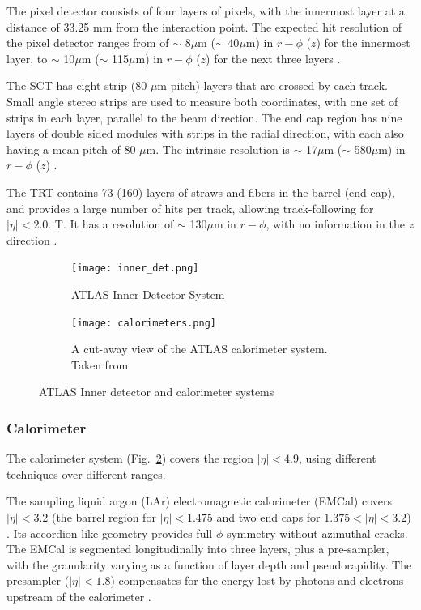 The pixel detector consists of four layers of pixels, with the innermost layer at a distance of 33.25 mm from the interaction point. The expected hit resolution of the pixel detector ranges from of $\sim$ 8$\mu$m ($\sim$ 40$\mu$m) in $r-\phi$ ($z$) \cite{ibl_design} for the innermost layer, to $\sim$ 10$\mu$m ($\sim$ 115$\mu$m) in $r-\phi$ ($z$) for the next three layers \cite{Aad:2008zzm}.

The SCT has eight strip (80 $\mu$m pitch) layers that are crossed by each track. Small angle stereo strips are used to measure both coordinates, with one set of strips in each layer, parallel to the beam direction. The end cap region has nine layers of double sided modules with strips in the radial direction, with each also having a mean pitch of 80 $\mu$m. The intrinsic resolution is $\sim$ 17$\mu$m ($\sim$ 580$\mu$m) in $r-\phi$ ($z$)  \cite{Aad:2008zzm}.

The TRT contains 73 (160) layers of straws and fibers in the barrel (end-cap), and provides a large number of hits per track, allowing track-following for $|\eta| <  2.0$. T. It has a resolution of $\sim$ 130$\mu$m in $r-\phi$, with no information in the $z$ direction \cite{Aad:2008zzm}.

 \begin{figure}[htbp!]
    \centering
      \begin{subfigure}{0.44\textwidth}
        \texttt{[image: inner\_det.png]}
          \caption{ATLAS Inner Detector System}
          \label{fig:inner_det}
      \end{subfigure}
      \hfill
      \begin{subfigure}{0.49\textwidth}
        \texttt{[image: calorimeters.png]}
          \caption{A cut-away view of the ATLAS calorimeter system. Taken from \cite{Aad:2008zzm}}
          \label{fig:cal}
      \end{subfigure}
\caption{
\label{fig:atlas_systems}%
ATLAS Inner detector and calorimeter systems}
\end{figure}


\subsubsection{Calorimeter}
The calorimeter system (Fig.~\ref{fig:cal}) covers the region $|\eta| < 4.9$, using different techniques over different ranges.

The sampling liquid argon (LAr) electromagnetic calorimeter (EMCal) covers $|\eta| < 3.2$ (the barrel region for $|\eta| < 1.475$ and two end caps for $1.375 < |\eta| < 3.2$) . Its accordion-like geometry provides full $\phi$ symmetry without azimuthal cracks. The EMCal is segmented longitudinally into three layers, plus a pre-sampler, with the granularity varying as a function of layer depth and pseudorapidity. The presampler ($|\eta| <1.8$) compensates for the energy lost by photons and electrons upstream of the calorimeter \cite{Aad:2008zzm}.  

